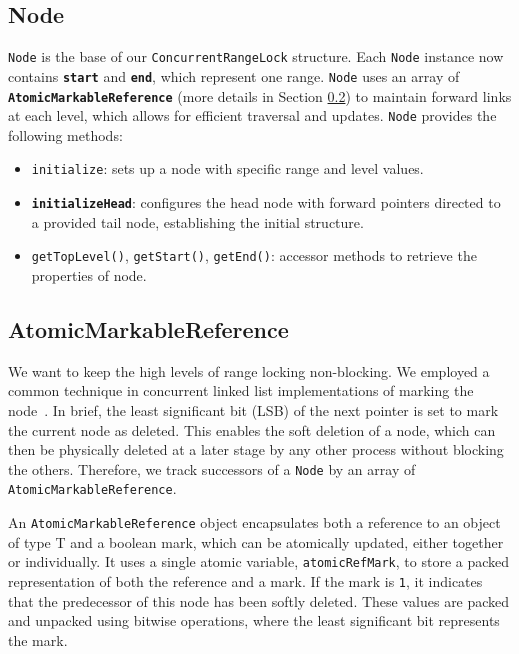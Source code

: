 \subsection{Node}\label{subsec:node}

\texttt{Node} is the base of our \texttt{ConcurrentRangeLock} structure.
Each \texttt{Node} instance now contains \textbf{\texttt{start}} and \textbf{\texttt{end}}, which represent one range.
\texttt{Node} uses an array of \textbf{\texttt{AtomicMarkableReference}} (more details in Section \ref{subsec:atomicmarkablereference}) to maintain forward links at each level, which allows for efficient traversal and updates. 
\texttt{Node} provides the following methods:

\begin{itemize}
    \item \texttt{initialize}: sets up a node with specific range and level values.
    \item \textbf{\texttt{initializeHead}}: configures the head node with forward pointers directed to a provided tail node, establishing the initial structure.
    \item \texttt{getTopLevel()}, \texttt{getStart()}, \texttt{getEnd()}: accessor methods to retrieve the properties of node.
\end{itemize}

\begin{figure}[h]
    \centering
    
\end{figure}

\clearpage

\subsection{AtomicMarkableReference} \label{subsec:atomicmarkablereference}

We want to keep the high levels of range locking non-blocking. 
We employed a common technique in concurrent linked list implementations of marking the node~\parencite{harris2001pragmatic}. 
In brief, the least significant bit (LSB) of the next pointer is set to mark the current node as deleted. 
This enables the soft deletion of a node, which can then be physically deleted at a later stage by any other process without blocking the others. 
Therefore, we track successors of a \texttt{Node} by an array of \texttt{AtomicMarkableReference}.

An \texttt{AtomicMarkableReference} object encapsulates both a reference to an object of type T and a boolean mark, which can be atomically updated, either together or individually. 
It uses a single atomic variable, \texttt{atomicRefMark}, to store a packed representation of both the reference and a mark. 
If the mark is \texttt{1}, it indicates that the predecessor of this node has been softly deleted. 
These values are packed and unpacked using bitwise operations, where the least significant bit represents the mark.

